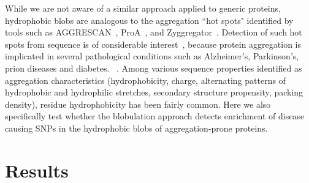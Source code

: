 \documentclass[10pt,letterpaper]{article}
\begin{document}
While we are not aware of a similar approach applied to generic proteins, hydrophobic blobs are analogous to the aggregation ``hot spots" identified by tools such as AGGRESCAN~\cite{ConchilloSole2007}, ProA~\cite{Fang2013}, and Zyggregator~\cite{Tartaglia2008}. Detection of such hot spots from sequence is of considerable interest~\cite{Pallares2019,MaurerStroh2010,Tartaglia2005,Pawar2005}, because
protein aggregation is implicated in several pathological conditions such as Alzheimer’s, Parkinson’s, prion diseases and diabetes. ~\cite{Pallares2019,Dobson2002, Cohen2003}. 
Among various sequence properties identified as aggregation characteristics (hydrophobicity, charge, alternating patterns of hydrophobic and hydrophilic stretches, secondary structure propensity, packing density), residue hydrophobicity has been fairly common. 
 Here we also specifically test whether the blobulation approach detects enrichment of disease causing SNPs in the hydrophobic blobs of aggregation-prone proteins.  


\section*{Results}
\end{document}
